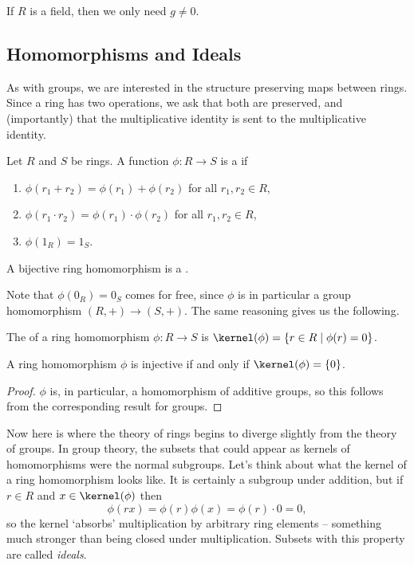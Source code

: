 \begin{remark}
	If $R$ is a field, then we only need $g \neq 0$.
\end{remark}

\subsection{Homomorphisms and Ideals}

As with groups, we are interested in the structure preserving maps between rings. Since a ring has two operations, we ask that both are preserved, and (importantly) that the multiplicative identity is sent to the multiplicative identity.

\begin{definition}
	Let $R$ and $S$ be rings. A function $\phi: R \rightarrow S$ is a  if
	\begin{enumerate}[label=(\roman*)]
		\item $\phi(r_1 + r_2) = \phi(r_1) + \phi(r_2)$ for all $r_1, r_2 \in R$,
		\item $\phi(r_1 \cdot r_2) = \phi(r_1) \cdot \phi(r_2)$ for all $r_1, r_2 \in R$,
		\item $\phi(1_R) = 1_S$.
	\end{enumerate}
	A bijective ring homomorphism is a .
\end{definition}

Note that $\phi(0_R) = 0_S$ comes for free, since $\phi$ is in particular a group homomorphism $(R, +) \rightarrow (S, +)$. The same reasoning gives us the following.

\begin{definition}[Kernel]
	The  of a ring homomorphism $\phi : R \rightarrow S$ is $\kernel(\phi) = \{r \in R \mid \phi(r) = 0\}$.
\end{definition}

\begin{lemma}
	A ring homomorphism $\phi$ is injective if and only if $\kernel(\phi) = \{0\}$.
\end{lemma}
\begin{proof}
	$\phi$ is, in particular, a homomorphism of additive groups, so this follows from the corresponding result for groups.
\end{proof}

Now here is where the theory of rings begins to diverge slightly from the theory of groups. In group theory, the subsets that could appear as kernels of homomorphisms were the normal subgroups. Let's think about what the kernel of a ring homomorphism looks like. It is certainly a subgroup under addition, but if $r \in R$ and $x \in \kernel(\phi)$ then
$$
\phi(rx) = \phi(r)\phi(x) = \phi(r) \cdot 0 = 0,
$$
so the kernel `absorbs' multiplication by arbitrary ring elements -- something much stronger than being closed under multiplication. Subsets with this property are called \emph{ideals}.


